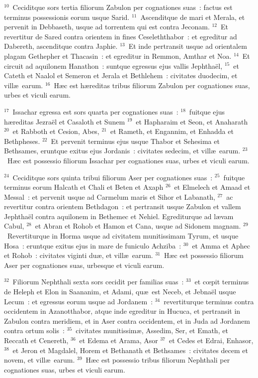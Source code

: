 ${}^{10}$~Ceciditque sors tertia filiorum Zabulon per cognationes suas~: factus est terminus possessionis eorum usque Sarid.
${}^{11}$~Ascenditque de mari et Merala, et pervenit in Debbaseth, usque ad torrentem qui est contra Jeconam.
${}^{12}$~Et revertitur de Sared contra orientem in fines Ceseleththabor~: et egreditur ad Dabereth, ascenditque contra Japhie.
${}^{13}$~Et inde pertransit usque ad orientalem plagam Gethepher et Thacasin~: et egreditur in Remmon, Amthar et Noa.
${}^{14}$~Et circuit ad aquilonem Hanathon~: suntque egressus ejus vallis Jephtha\"el,
${}^{15}$~et Cateth et Naalol et Semeron et Jerala et Bethlehem~: civitates duodecim, et vill\ae\ earum.
${}^{16}$~H\ae c est h\ae reditas tribus filiorum Zabulon per cognationes suas, urbes et viculi earum.


${}^{17}$~Issachar egressa est sors quarta per cognationes suas~:
${}^{18}$~fuitque ejus h\ae reditas Jezra\"el et Casaloth et Sunem
${}^{19}$~et Hapharaim et Seon, et Anaharath
${}^{20}$~et Rabboth et Cesion, Abes,
${}^{21}$~et Rameth, et Engannim, et Enhadda et Bethpheses.
${}^{22}$~Et pervenit terminus ejus usque Thabor et Sehesima et Bethsames, eruntque exitus ejus Jordanis~: civitates sedecim, et vill\ae\ earum.
${}^{23}$~H\ae c est possessio filiorum Issachar per cognationes suas, urbes et viculi earum.


${}^{24}$~Ceciditque sors quinta tribui filiorum Aser per cognationes suas~:
${}^{25}$~fuitque terminus eorum Halcath et Chali et Beten et Axaph
${}^{26}$~et Elmelech et Amaad et Messal~: et pervenit usque ad Carmelum maris et Sihor et Labanath,
${}^{27}$~ac revertitur contra orientem Bethdagon~: et pertransit usque Zabulon et vallem Jephtha\"el contra aquilonem in Bethemec et Nehiel. Egrediturque ad l\ae vam Cabul,
${}^{28}$~et Abran et Rohob et Hamon et Cana, usque ad Sidonem magnam.
${}^{29}$~Revertiturque in Horma usque ad civitatem munitissimam Tyrum, et usque Hosa~: eruntque exitus ejus in mare de funiculo Achziba~:
${}^{30}$~et Amma et Aphec et Rohob~: civitates viginti du\ae , et vill\ae\ earum.
${}^{31}$~H\ae c est possessio filiorum Aser per cognationes suas, urbesque et viculi earum.


${}^{32}$~Filiorum Nephthali sexta sors cecidit per familias suas~:
${}^{33}$~et cœpit terminus de Heleph et Elon in Saananim, et Adami, qu\ae\ est Neceb, et Jebna\"el usque Lecum~: et egressus eorum usque ad Jordanem~:
${}^{34}$~revertiturque terminus contra occidentem in Azanotthabor, atque inde egreditur in Hucuca, et pertransit in Zabulon contra meridiem, et in Aser contra occidentem, et in Juda ad Jordanem contra ortum solis~:
${}^{35}$~civitates munitissim\ae , Assedim, Ser, et Emath, et Reccath et Cenereth,
${}^{36}$~et Edema et Arama, Asor
${}^{37}$~et Cedes et Edrai, Enhasor,
${}^{38}$~et Jeron et Magdalel, Horem et Bethanath et Bethsames~: civitates decem et novem, et vill\ae\ earum.
${}^{39}$~H\ae c est possessio tribus filiorum Nephthali per cognationes suas, urbes et viculi earum.


